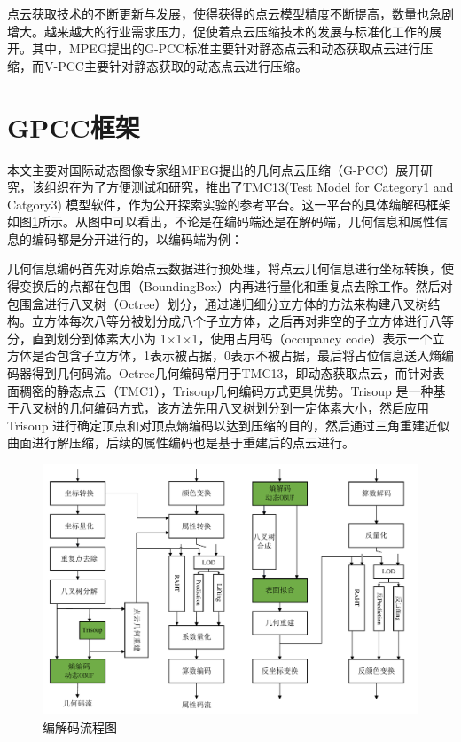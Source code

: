 \documentclass[bachelor,print,msfonts]{xduthesis}
\begin{document}
点云获取技术的不断更新与发展，使得获得的点云模型精度不断提高，数量也急剧增大。越来越大的行业需求压力，促使着点云压缩技术的发展与标准化工作的展开。其中，MPEG提出的G-PCC标准主要针对静态点云和动态获取点云进行压缩，而V-PCC主要针对静态获取的动态点云进行压缩。

\section{GPCC框架}
本文主要对国际动态图像专家组MPEG提出的几何点云压缩（G-PCC）展开研究，该组织在为了方便测试和研究，推出了TMC13(Test Model for Category1 and Catgory3) 模型软件\cite{ref16}，作为公开探索实验的参考平台。这一平台的具体编解码框架如图\ref{fig:编解码流程图}所示。从图中可以看出，不论是在编码端还是在解码端，几何信息和属性信息的编码都是分开进行的，以编码端为例：

几何信息编码首先对原始点云数据进行预处理，将点云几何信息进行坐标转换，使得变换后的点都在包围（BoundingBox）内再进行量化和重复点去除工作。然后对包围盒进行八叉树（Octree）划分，通过递归细分立方体的方法来构建八叉树结构。立方体每次八等分被划分成八个子立方体，之后再对非空的子立方体进行八等分，直到划分到体素大小为 1×1×1，使用占用码（occupancy code）表示一个立方体是否包含子立方体，1表示被占据，0表示不被占据，最后将占位信息送入熵编码器得到几何码流。Octree几何编码常用于TMC13，即动态获取点云，而针对表面稠密的静态点云（TMC1），Trisoup几何编码方式更具优势。Trisoup 是一种基于八叉树的几何编码方式，该方法先用八叉树划分到一定体素大小，然后应用 Trisoup 进行确定顶点和对顶点熵编码以达到压缩的目的，然后通过三角重建近似曲面进行解压缩，后续的属性编码也是基于重建后的点云进行。
\begin{figure}[htbp]
    \centering
    \includegraphics[scale=0.5]{image/编解码流程图ykv2.pdf}
    \caption{编解码流程图}
    \label{fig:编解码流程图}
\end{figure}
\end{document}

